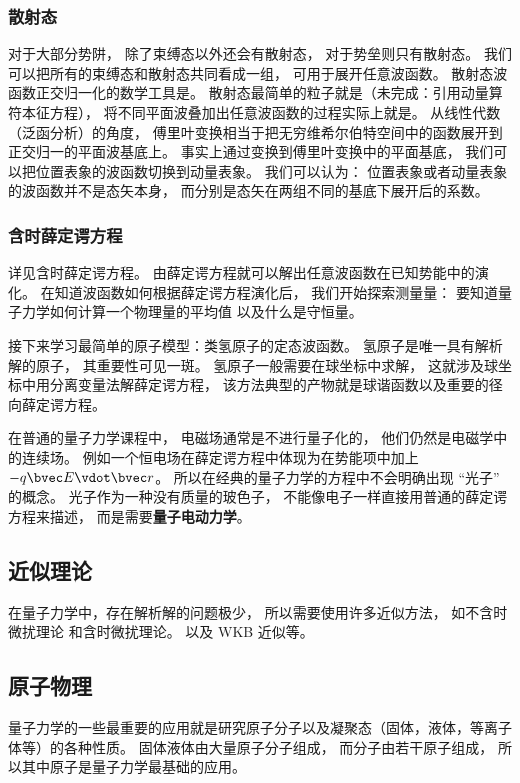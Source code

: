 \subsubsection{散射态}
对于大部分势阱， 除了束缚态以外还会有散射态， 对于势垒则只有散射态。 我们可以把所有的束缚态和散射态共同看成一组， 可用于展开任意波函数。 散射态波函数正交归一化的数学工具是。 散射态最简单的粒子就是（未完成：引用动量算符本征方程）， 将不同平面波叠加出任意波函数的过程实际上就是。 从线性代数（泛函分析）的角度， 傅里叶变换相当于把无穷维希尔伯特空间中的函数展开到正交归一的平面波基底上。 事实上通过变换到傅里叶变换中的平面基底， 我们可以把位置表象的波函数切换到动量表象。 我们可以认为： 位置表象或者动量表象的波函数并不是态矢本身， 而分别是态矢在两组不同的基底下展开后的系数。

\subsubsection{含时薛定谔方程}
详见含时薛定谔方程。 由薛定谔方程就可以解出任意波函数在已知势能中的演化。 在知道波函数如何根据薛定谔方程演化后， 我们开始探索测量量： 要知道量子力学如何计算一个物理量的平均值 以及什么是守恒量。

接下来学习最简单的原子模型：类氢原子的定态波函数。 氢原子是唯一具有解析解的原子， 其重要性可见一斑。 氢原子一般需要在球坐标中求解， 这就涉及球坐标中用分离变量法解薛定谔方程， 该方法典型的产物就是球谐函数以及重要的径向薛定谔方程。

在普通的量子力学课程中， 电磁场通常是不进行量子化的， 他们仍然是电磁学中的连续场。 例如一个恒电场在薛定谔方程中体现为在势能项中加上 $-q\bvec E \vdot \bvec r$。 所以在经典的量子力学的方程中不会明确出现 “光子” 的概念。 光子作为一种没有质量的玻色子， 不能像电子一样直接用普通的薛定谔方程来描述， 而是需要\textbf{量子电动力学}。

\subsection{近似理论}
在量子力学中，存在解析解的问题极少， 所以需要使用许多近似方法， 如不含时微扰理论 和含时微扰理论。 以及 WKB 近似等。

\subsection{原子物理}
量子力学的一些最重要的应用就是研究原子分子以及凝聚态（固体，液体，等离子体等）的各种性质。 固体液体由大量原子分子组成， 而分子由若干原子组成， 所以其中原子是量子力学最基础的应用。

